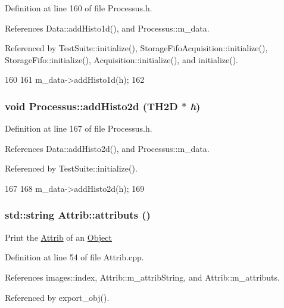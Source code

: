 Definition at line 160 of file Processus.h.

References Data::addHisto1d(), and Processus::m\_\-data.

Referenced by TestSuite::initialize(), StorageFifoAcquisition::initialize(), StorageFifo::initialize(), Acquisition::initialize(), and initialize().


\begin{DoxyCode}
160                            {
161     m_data->addHisto1d(h);
162   }
\end{DoxyCode}
\hypertarget{classProcessus_ac1ed1aed5edaeabdf18aa56775440471}{
\subsubsection[{addHisto2d}]{\setlength{\rightskip}{0pt plus 5cm}void Processus::addHisto2d (TH2D $\ast$ {\em h})}}
\label{classProcessus_ac1ed1aed5edaeabdf18aa56775440471}


Definition at line 167 of file Processus.h.

References Data::addHisto2d(), and Processus::m\_\-data.

Referenced by TestSuite::initialize().


\begin{DoxyCode}
167                            {
168     m_data->addHisto2d(h);
169   }
\end{DoxyCode}
\hypertarget{classAttrib_aee7bbf16b144887f196e1341b24f8a26}{
\subsubsection[{attributs}]{\setlength{\rightskip}{0pt plus 5cm}std::string Attrib::attributs ()}}
\label{classAttrib_aee7bbf16b144887f196e1341b24f8a26}
Print the \hyperlink{classAttrib}{Attrib} of an \hyperlink{classObject}{Object} 

Definition at line 54 of file Attrib.cpp.

References images::index, Attrib::m\_\-attribString, and Attrib::m\_\-attributs.

Referenced by export\_\-obj().


